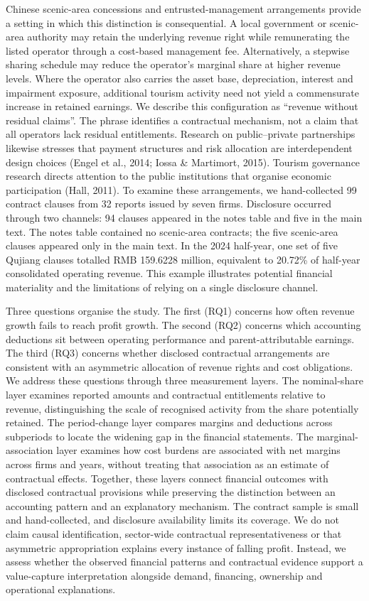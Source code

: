 \documentclass[review,3p,times]{elsarticle}
\begin{document}
Chinese scenic-area concessions and entrusted-management arrangements provide a setting in which this distinction is consequential. A local government or scenic-area authority may retain the underlying revenue right while remunerating the listed operator through a cost-based management fee. Alternatively, a stepwise sharing schedule may reduce the operator's marginal share at higher revenue levels. Where the operator also carries the asset base, depreciation, interest and impairment exposure, additional tourism activity need not yield a commensurate increase in retained earnings. We describe this configuration as ``revenue without residual claims''. The phrase identifies a contractual mechanism, not a claim that all operators lack residual entitlements. Research on public--private partnerships likewise stresses that payment structures and risk allocation are interdependent design choices (Engel et al., 2014; Iossa \& Martimort, 2015). Tourism governance research directs attention to the public institutions that organise economic participation (Hall, 2011). To examine these arrangements, we hand-collected 99 contract clauses from 32 reports issued by seven firms. Disclosure occurred through two channels: 94 clauses appeared in the notes table and five in the main text. The notes table contained no scenic-area contracts; the five scenic-area clauses appeared only in the main text. In the 2024 half-year, one set of five Qujiang clauses totalled RMB 159.6228 million, equivalent to 20.72\% of half-year consolidated operating revenue. This example illustrates potential financial materiality and the limitations of relying on a single disclosure channel.

Three questions organise the study. The first (RQ1) concerns how often revenue growth fails to reach profit growth. The second (RQ2) concerns which accounting deductions sit between operating performance and parent-attributable earnings. The third (RQ3) concerns whether disclosed contractual arrangements are consistent with an asymmetric allocation of revenue rights and cost obligations. We address these questions through three measurement layers. The nominal-share layer examines reported amounts and contractual entitlements relative to revenue, distinguishing the scale of recognised activity from the share potentially retained. The period-change layer compares margins and deductions across subperiods to locate the widening gap in the financial statements. The marginal-association layer examines how cost burdens are associated with net margins across firms and years, without treating that association as an estimate of contractual effects. Together, these layers connect financial outcomes with disclosed contractual provisions while preserving the distinction between an accounting pattern and an explanatory mechanism. The contract sample is small and hand-collected, and disclosure availability limits its coverage. We do not claim causal identification, sector-wide contractual representativeness or that asymmetric appropriation explains every instance of falling profit. Instead, we assess whether the observed financial patterns and contractual evidence support a value-capture interpretation alongside demand, financing, ownership and operational explanations.
\end{document}
